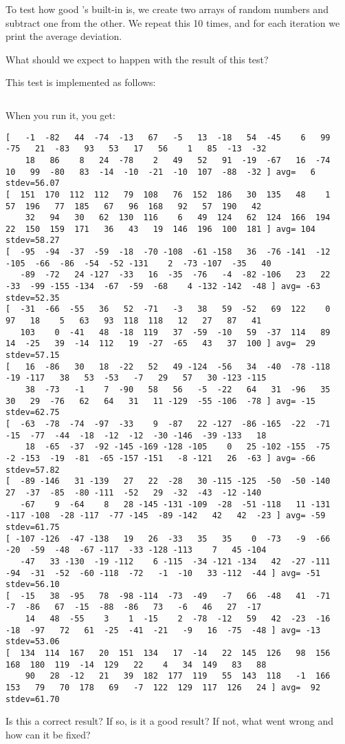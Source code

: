To test how good \csharp's built-in  is, we create two arrays of random numbers and subtract one from the other. We repeat this 10 times, and for each iteration we print the average deviation.

What should we expect to happen with the result of this test?

This test is implemented as follows:
\inputminted{csharp}{\context/question/RandomTest.cs}

When you run it, you get:
{\tiny
\begin{verbatim}
[   -1  -82   44  -74  -13   67   -5   13  -18   54  -45    6   99  -75   21  -83   93   53   17   56    1   85  -13  -32
    18   86    8   24  -78    2   49   52   91  -19  -67   16  -74   10   99  -80   83  -14  -10  -21  -10  107  -88  -32 ] avg=   6 stdev=56.07
[  151  170  112  112   79  108   76  152  186   30  135   48    1   57  196   77  185   67   96  168   92   57  190   42
    32   94   30   62  130  116    6   49  124   62  124  166  194   22  150  159  171   36   43   19  146  196  100  181 ] avg= 104 stdev=58.27
[  -95  -94  -37  -59  -18  -70 -108  -61 -158   36  -76 -141  -12 -105  -66  -86  -54  -52 -131    2  -73 -107  -35   40
   -89  -72   24 -127  -33   16  -35  -76   -4  -82 -106   23   22  -33  -99 -155 -134  -67  -59  -68    4 -132 -142  -48 ] avg= -63 stdev=52.35
[  -31  -66  -55   36   52  -71   -3   38   59  -52   69  122    0   97   18    5   63   93  118  118   12   27   87   41
   103    0  -41   48  -18  119   37  -59  -10   59  -37  114   89   14  -25   39  -14  112   19  -27  -65   43   37  100 ] avg=  29 stdev=57.15
[   16  -86   30   18  -22   52   49 -124  -56   34  -40  -78 -118  -19 -117   38   53  -53   -7   29   57   30 -123 -115
    38  -73   -1    7  -90   58   56   -5  -22   64   31  -96   35   30   29  -76   62   64   31   11 -129  -55 -106  -78 ] avg= -15 stdev=62.75
[  -63  -78  -74  -97  -33    9  -87   22 -127  -86 -165  -22  -71  -15  -77  -44  -18  -12  -12  -30 -146  -39 -133   18
    18  -65  -37  -92 -145 -169 -128 -105    0   25 -102 -155  -75   -2 -153  -19  -81  -65 -157 -151   -8 -121   26  -63 ] avg= -66 stdev=57.82
[  -89 -146   31 -139   27   22  -28   30 -115 -125  -50  -50 -140   27  -37  -85  -80 -111  -52   29  -32  -43  -12 -140
   -67    9  -64    8   28 -145 -131 -109  -28  -51 -118   11 -131 -117 -108  -28 -117  -77 -145  -89 -142   42   42  -23 ] avg= -59 stdev=61.75
[ -107 -126  -47 -138   19   26  -33   35   35    0  -73   -9  -66  -20  -59  -48  -67 -117  -33 -128 -113    7   45 -104
   -47   33 -130  -19 -112    6 -115  -34 -121 -134   42  -27 -111  -94  -31  -52  -60 -118  -72   -1  -10   33 -112  -44 ] avg= -51 stdev=56.10
[  -15   38  -95   78  -98 -114  -73  -49   -7   66  -48   41  -71   -7  -86   67  -15  -88  -86   73   -6   46   27  -17
    14   48  -55    3    1  -15    2  -78  -12   59   42  -23  -16  -18  -97   72   61  -25  -41  -21   -9   16  -75  -48 ] avg= -13 stdev=53.06
[  134  114  167   20  151  134   17  -14   22  145  126   98  156  168  180  119  -14  129   22    4   34  149   83   88
    90   28  -12   21   39  182  177  119   55  143  118   -1  166  153   79   70  178   69   -7  122  129  117  126   24 ] avg=  92 stdev=61.70
\end{verbatim}
}

Is this a correct result? If so, is it a good result? If not, what went wrong and how can it be fixed?


